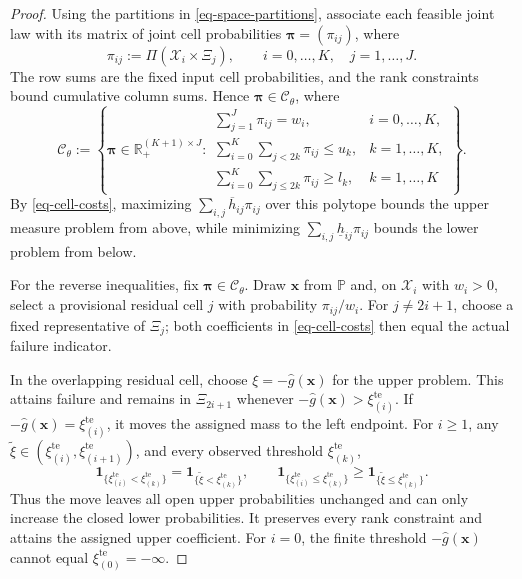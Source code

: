 \documentclass[review,11pt,3p,authoryear,nopreprintline]{elsarticle}
\begin{document}
\begin{proof}
  Using the partitions in \eqref{eq-space-partitions}, associate each feasible joint law with its matrix of joint cell probabilities $\bm\pi=(\pi_{ij})$, where
  \begin{equation}
    \pi_{ij}:=\Pi(\mathcal X_i\times\Xi_j),
    \qquad i=0,\ldots,K,\quad j=1,\ldots,J.
    \label{eq-joint-cell-masses}
  \end{equation}
  The row sums are the fixed input cell probabilities, and the rank constraints bound cumulative column sums. Hence $\bm\pi\in\mathcal C_\theta$, where
  \begin{equation}
    \mathcal C_\theta:=
    \left\{\bm\pi\in\mathbb R_+^{(K+1)\times J}:
    \begin{array}{ll}
      \displaystyle\sum_{j=1}^J\pi_{ij}=w_i,
        &i=0,\ldots,K,\\[1mm]
      \displaystyle\sum_{i=0}^K\sum_{j<2k}\pi_{ij}\le u_k,
        &k=1,\ldots,K,\\[1mm]
      \displaystyle\sum_{i=0}^K\sum_{j\le2k}\pi_{ij}\ge l_k,
        &k=1,\ldots,K
    \end{array}\right\}.
    \label{eq-cell-mass-polytope}
  \end{equation}
  By \eqref{eq-cell-costs}, maximizing $\sum_{i,j}\overline h_{ij}\pi_{ij}$ over this polytope bounds the upper measure problem from above, while minimizing $\sum_{i,j}\underline h_{ij}\pi_{ij}$ bounds the lower problem from below.

  For the reverse inequalities, fix $\bm\pi\in\mathcal C_\theta$. Draw $\bm x$ from $\mathbb P$ and, on $\mathcal X_i$ with $w_i>0$, select a provisional residual cell $j$ with probability $\pi_{ij}/w_i$. For $j\ne2i+1$, choose a fixed representative of $\Xi_j$; both coefficients in \eqref{eq-cell-costs} then equal the actual failure indicator.

  In the overlapping residual cell, choose $\xi=-\hat g(\bm x)$ for the upper problem. This attains failure and remains in $\Xi_{2i+1}$ whenever $-\hat g(\bm x)>\xi_{(i)}^{\mathrm{te}}$. If $-\hat g(\bm x)=\xi_{(i)}^{\mathrm{te}}$, it moves the assigned mass to the left endpoint. For $i\ge1$, any $\widetilde\xi\in(\xi_{(i)}^{\mathrm{te}},\xi_{(i+1)}^{\mathrm{te}})$, and every observed threshold $\xi_{(k)}^{\mathrm{te}}$,
  \begin{equation}
    \mathbf1_{\{\xi_{(i)}^{\mathrm{te}}<\xi_{(k)}^{\mathrm{te}}\}}=\mathbf1_{\{\widetilde\xi<\xi_{(k)}^{\mathrm{te}}\}},\qquad
    \mathbf1_{\{\xi_{(i)}^{\mathrm{te}}\le \xi_{(k)}^{\mathrm{te}}\}}\ge\mathbf1_{\{\widetilde\xi\le \xi_{(k)}^{\mathrm{te}}\}}.
    \label{eq-endpoint-move}
  \end{equation}
  Thus the move leaves all open upper probabilities unchanged and can only increase the closed lower probabilities. It preserves every rank constraint and attains the assigned upper coefficient. For $i=0$, the finite threshold $-\hat g(\bm x)$ cannot equal $\xi_{(0)}^{\mathrm{te}}=-\infty$.


\end{proof}
\end{document}
